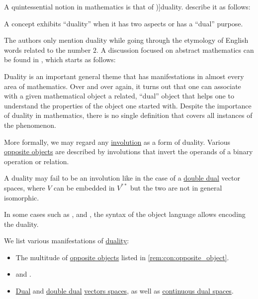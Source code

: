 \begin{concept}\label{con:duality}
  A quintessential notion in mathematics is that of \term[en=duality (\cite[159]{Kuyk1977ComplementarityInMathematics})]{duality}. \Textcite[5]{ConwayGuy1998BookOfNumbers} describe it as follows:
  \begin{displayquote}
    A concept exhibits \enquote{duality} when it has two aspects or has a \enquote{dual} purpose.
  \end{displayquote}

  The authors only mention duality while going through the etymology of English words related to the number \( 2 \). A discussion focused on abstract mathematics can be found in \cite[\S III.19]{GowersEtAl2008PrincetonCompanion}, which starts as follows:
  \begin{displayquote}
    Duality is an important general theme that has manifestations in almost every area of mathematics. Over and over again, it turns out that one can associate with a given mathematical object a related, \enquote{dual} object that helps one to understand the properties of the object one started with. Despite the importance of duality in mathematics, there is no single definition that covers all instances of the phenomenon.
  \end{displayquote}

  More formally, we may regard any \hyperref[def:categorical_involution]{involution} as a form of duality. Various \hyperref[con:opposite_object]{opposite objects} are described by involutions that invert the operands of a binary operation or relation.

  A duality may fail to be an involution like in the case of a \hyperref[rem:double_dual]{double dual} vector spaces, where \( V \) can be embedded in \( V^{**} \) but the two are not in general isomorphic.

  In some cases such as ,  and , the syntax of the object language allows encoding the duality.
\end{concept}

\begin{remark}\label{rem:duality}
  We list various manifestations of \hyperref[con:duality]{duality}:
  \begin{itemize}
    \item The multitude of \hyperref[con:opposite_object]{opposite objects} listed in \cref{rem:con:opposite_object}.

    \item {} and .

    \item \hyperref[def:dual_vector_space]{Dual} and \hyperref[rem:double_dual]{double dual} \hyperref[def:vector_space]{vectors spaces}, as well as \hyperref[def:continuous_dual_space]{continuous dual spaces}.
  \end{itemize}
\end{remark}


